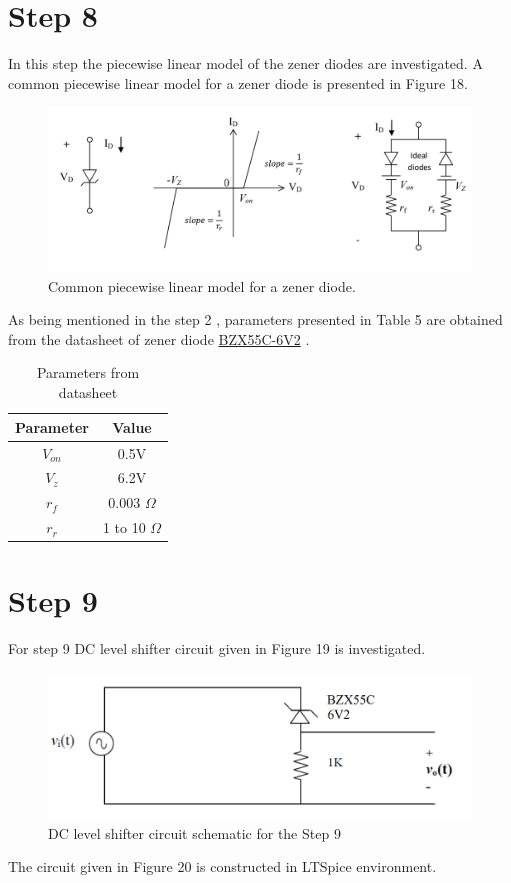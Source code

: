 \documentclass[letterpaper,12pt]{article}
\begin{document}
\section{Step 8}
In this step the piecewise linear model of the zener diodes are investigated. A common piecewise linear model for a zener diode is presented in Figure 18.

\begin{figure}[H]
    \centering
   \includegraphics[width=1\textwidth]{8_1.png}
   \caption{Common piecewise linear model for a zener diode.}
\end{figure} 

As being mentioned in the step 2 ,  parameters presented in Table 5 are obtained from the datasheet of zener diode \href{https://www.vishay.com/docs/85604/bzx55.pdf}{BZX55C-6V2} . 
\begin{table}[H]
    \begin{center}
    \caption{ Parameters from datasheet}
    \vspace{2mm}
    \begin{tabular}{||c | c ||} 
    \hline
    Parameter & Value \\ [0.5ex] 
    \hline\hline
    \(V_{on}\) & 0.5V  \\ 
    \hline
    \(V_z\) & 6.2V  \\ 
    \hline
    \(r_f\) & 0.003 \(\Omega\)  \\ 
    \hline
    \(r_r\)& 1 to 10 \(\Omega\)  \\ 
\hline
\end{tabular}
\end{center}
\end{table}


\section{Step 9}
For step 9 DC level shifter circuit given in Figure 19 is investigated. 
\begin{figure}[H]
    \centering
   \includegraphics[width=1\textwidth]{9_1.png}
   \caption{DC level shifter circuit schematic for the Step 9}
\end{figure} 
The circuit given in Figure 20 is constructed in LTSpice environment.
\end{document}

